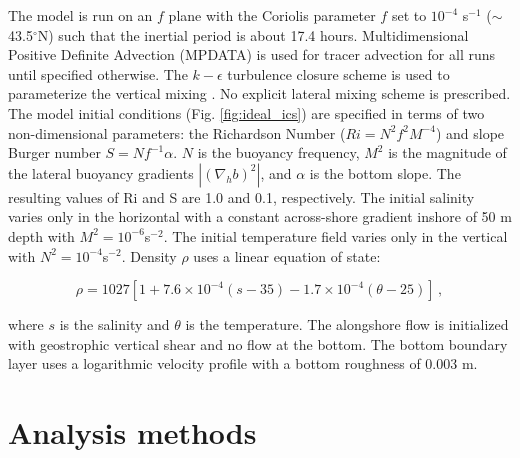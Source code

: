 \documentclass[draft]{agujournal2019}
\begin{document}
The model is run on an $f$ plane with the Coriolis parameter $f$ set to $10^{-4}$ s$^{-1}$ ($\sim$ 43.5$^\circ$N) such that the inertial period is about 17.4 hours. Multidimensional Positive Definite Advection (MPDATA) is used for tracer advection \cite{Smolarkiewicz_1998} for all runs until specified otherwise. The $k-\epsilon$ turbulence closure scheme is used to parameterize the vertical mixing \cite{umlauf2003generic, Warner_2005}. No explicit lateral mixing scheme is prescribed. The model initial conditions (Fig. \ref{fig:ideal_ics}) are specified in terms of two non-dimensional parameters: the Richardson Number ($Ri=N^2f^2M^{-4}$) and slope Burger number $S=Nf^{-1}\alpha$. $N$ is the buoyancy frequency, $M^2$ is the magnitude of the lateral buoyancy gradients $|\left(\nabla_h b \right)^2|$, and $\alpha$ is the bottom slope. The resulting values of Ri and S are 1.0 and 0.1, respectively. The initial salinity varies only in the horizontal with a constant across-shore gradient inshore of 50 m depth with $M^2=10^{-6}$s$^{-2}$. The initial temperature field varies only in the vertical with $N^2 = 10^{-4}$s$^{-2}$. Density $\rho$ uses a linear equation of state:
\begin{linenomath*}
    \begin{equation} \label{eqn:EOS}
        \rho = 1027 \left[1+7.6 \times 10^{-4}(s-35)-1.7 \times 10^{-4} (\theta-25) \right] \, , 
    \end{equation}
\end{linenomath*}
where $s$ is the salinity and $\theta$ is the temperature.
The alongshore flow is initialized with geostrophic vertical shear and no flow at the bottom. The bottom boundary layer uses a logarithmic velocity profile with a bottom roughness of 0.003 m.

\section{Analysis methods} \label{sec:analysis_tools}
\end{document}
